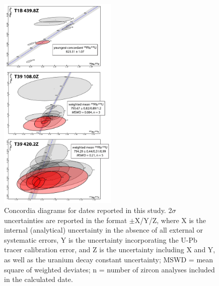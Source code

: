 \documentclass[11pt,letterpaper]{article}
\begin{document}
\begin{figure}[h!]
\begin{center}
	\includegraphics[width=0.5\textwidth]{Figures/Concordia.pdf}
	\caption{Concordia diagrams for dates reported in this study. 2$\sigma$ uncertainties are reported in the format $\pm$X/Y/Z, where X is the internal (analytical) uncertainty in the absence of all external or systematic errors, Y is the uncertainty incorporating the U-Pb tracer calibration error, and Z is the uncertainty including X and Y, as well as the uranium decay constant uncertainty; MSWD = mean square of weighted deviates; n = number of zircon analyses included in the calculated date.}
	\label{fig:Concordia}
\end{center}
\end{figure}
\end{document}
